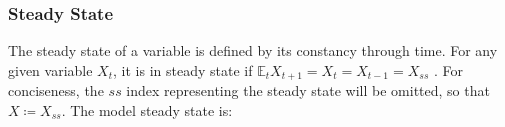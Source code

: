\documentclass[
thesis.tex
]{subfiles}
\begin{document}


\subsubsection{Steady State}

The steady state of a variable is defined by its constancy through time. For any given variable $X_t$, it is in steady state if $\mathbb{E}_t X_{t+1} = X_t = X_{t-1} = X_{ss}$ \cite[p.41]{costa_junior_understanding_2016}. For conciseness, the $ss$ index representing the steady state will be omitted, so that $X \coloneq X_{ss}$. The model steady state is:

\end{document}
